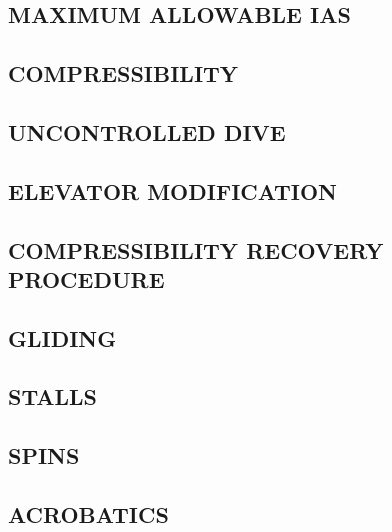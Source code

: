 \subsection{MAXIMUM ALLOWABLE IAS}
\subsection{COMPRESSIBILITY}
\subsection{UNCONTROLLED DIVE}
\subsection{ELEVATOR MODIFICATION}
\subsection{COMPRESSIBILITY RECOVERY PROCEDURE}
\subsection{GLIDING}
\subsection{STALLS}
\subsection{SPINS}
\subsection{ACROBATICS}


\cleardoublepage{}